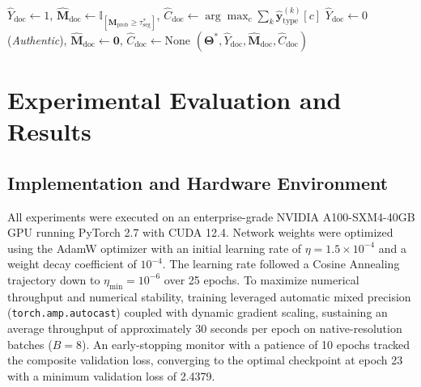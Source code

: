 \documentclass[pdflatex,sn-mathphys-num,iicol]{sn-jnl}
\begin{document}
\begin{algorithm}[!t]
\begin{algorithmic}[1]
 $\hat{Y}_{\text{doc}} \leftarrow 1$, $\hat{\mathbf{M}}_{\text{doc}} \leftarrow \mathbb{I}_{[\hat{\mathbf{M}}_{\text{prob}} \ge \tau_{\text{seg}}^*]}$, $\hat{C}_{\text{doc}} \leftarrow \arg\max_c \sum_{k} \hat{\mathbf{y}}_{\text{type}}^{(k)}[c]$
\Else $\hat{Y}_{\text{doc}} \leftarrow 0$ (\textit{Authentic}), $\hat{\mathbf{M}}_{\text{doc}} \leftarrow \mathbf{0}$, $\hat{C}_{\text{doc}} \leftarrow \text{None}$
\EndIf
\State \Return $(\boldsymbol{\Theta}^*, \hat{Y}_{\text{doc}}, \hat{\mathbf{M}}_{\text{doc}}, \hat{C}_{\text{doc}})$
\end{algorithmic}
\end{algorithm}

\section{Experimental Evaluation and Results}\label{sec5}

\subsection{Implementation and Hardware Environment}\label{subsec5_1}
All experiments were executed on an enterprise-grade NVIDIA A100-SXM4-40GB GPU running PyTorch 2.7 with CUDA 12.4. Network weights were optimized using the AdamW optimizer with an initial learning rate of $\eta = 1.5 \times 10^{-4}$ and a weight decay coefficient of $10^{-4}$. The learning rate followed a Cosine Annealing trajectory down to $\eta_{\text{min}} = 10^{-6}$ over 25 epochs. To maximize numerical throughput and numerical stability, training leveraged automatic mixed precision (\texttt{torch.amp.autocast}) coupled with dynamic gradient scaling, sustaining an average throughput of approximately 30 seconds per epoch on native-resolution batches ($B=8$). An early-stopping monitor with a patience of 10 epochs tracked the composite validation loss, converging to the optimal checkpoint at epoch 23 with a minimum validation loss of 2.4379.
\end{document}
